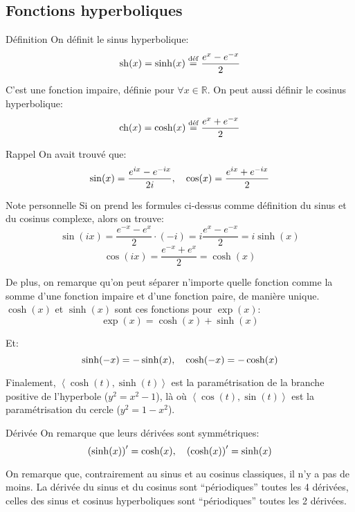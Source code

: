 \documentclass[a4paper]{article}
\begin{document}
\subsection{Fonctions hyperboliques}
\begin{parag}{Définition}
    On définit le sinus hyperbolique:
    \[\sh\left(x\right) = \sinh\left(x\right) \over{=}{déf} \frac{e^{x} - e^{-x}}{2}\]
    
    C'est une fonction impaire, définie pour $\forall x \in \mathbb{R}$. On peut aussi définir le cosinus hyperbolique: 
    \[\ch\left(x\right) = \cosh\left(x\right) \over{=}{déf} \frac{e^x + e^{-x}}{2}\]
    

    \begin{subparag}{Rappel}
        On avait trouvé que: 
        \[\sin\left(x\right) = \frac{e^{ix} - e^{-ix}}{2i}, \mathspace \cos\left(x\right) = \frac{e^{ix} + e^{-ix}}{2} \]
    \end{subparag}

    \begin{subparag}{Note personnelle}
        Si on prend les formules ci-dessus comme définition du sinus et du cosinus complexe, alors on trouve: 
        \[\sin\left(ix\right) = \frac{e^{-x} - e^{x}}{2} \cdot \left(-i\right) = i \frac{e^{x} - e^{-x}}{2} = i\sinh\left(x\right)\]
        \[\cos\left(ix\right) = \frac{e^{-x} + e^{x}}{2} = \cosh\left(x\right)\]
        
        De plus, on remarque qu'on peut séparer n'importe quelle fonction comme la somme d'une fonction impaire et d'une fonction paire, de manière unique. $\cosh\left(x\right)$ et $\sinh\left(x\right)$ sont ces fonctions pour $\exp\left(x\right)$: 
        \[\exp\left(x\right) = \cosh\left(x\right) + \sinh\left(x\right)\]

        Et: 
        \[\sinh\left(-x\right) = -\sinh\left(x\right), \mathspace \cosh\left(-x\right) = -\cosh\left(x\right)\]
        
        Finalement, $\left<\cosh\left(t\right), \sinh\left(t\right)\right>$ est la paramétrisation de la branche positive de l'hyperbole ($y^2 = x^2 - 1$), là où $\left<\cos\left(t\right), \sin\left(t\right)\right>$ est la paramétrisation du cercle ($y^2 = 1 - x^2$).
    \end{subparag}
    
\end{parag}

\begin{parag}{Dérivée}
    On remarque que leurs dérivées sont symmétriques: 
    \[\left(\sinh\left(x\right)\right)' = \cosh\left(x\right), \mathspace \left(\cosh\left(x\right)\right)' = \sinh\left(x\right)\]
    
    On remarque que, contrairement au sinus et au cosinus classiques, il n'y a pas de moins. La dérivée du sinus et du cosinus sont ``périodiques'' toutes les 4 dérivées, celles des sinus et cosinus hyperboliques sont ``périodiques'' toutes les 2 dérivées.
\end{parag}
\end{document}
